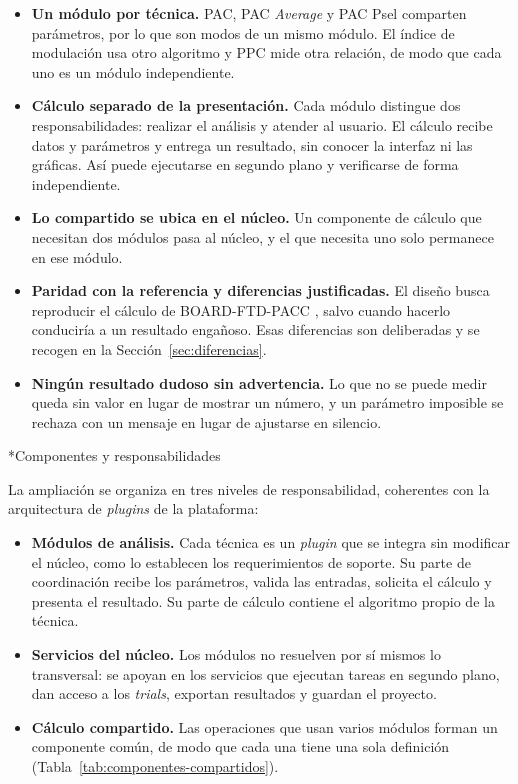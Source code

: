 \documentclass[12pt,letterpaper,oneside]{article}
\makeatletter
\newcommand{\subsubsubsection}[1]{%
  \@startsection{paragraph}{4}{\z@}{10pt plus 2pt minus 1pt}{4pt}%
    {\normalfont\normalsize\bfseries\itshape}*{#1}}
\makeatother
\begin{document}
\begin{itemize}
  \item \textbf{Un módulo por técnica.} PAC, PAC \textit{Average} y PAC Psel comparten parámetros, por lo que son modos de un mismo módulo. El índice de modulación usa otro algoritmo y PPC mide otra relación, de modo que cada uno es un módulo independiente.
  \item \textbf{Cálculo separado de la presentación.} Cada módulo distingue dos responsabilidades: realizar el análisis y atender al usuario. El cálculo recibe datos y parámetros y entrega un resultado, sin conocer la interfaz ni las gráficas. Así puede ejecutarse en segundo plano y verificarse de forma independiente.
  \item \textbf{Lo compartido se ubica en el núcleo.} Un componente de cálculo que necesitan dos módulos pasa al núcleo, y el que necesita uno solo permanece en ese módulo.
  \item \textbf{Paridad con la referencia y diferencias justificadas.} El diseño busca reproducir el cálculo de BOARD-FTD-PACC \cite{gauthier2023}, salvo cuando hacerlo conduciría a un resultado engañoso. Esas diferencias son deliberadas y se recogen en la Sección~\ref{sec:diferencias}.
  \item \textbf{Ningún resultado dudoso sin advertencia.} Lo que no se puede medir queda sin valor en lugar de mostrar un número, y un parámetro imposible se rechaza con un mensaje en lugar de ajustarse en silencio.
\end{itemize}

\subsubsubsection{Componentes y responsabilidades}

La ampliación se organiza en tres niveles de responsabilidad, coherentes con la arquitectura de \textit{plugins} de la plataforma:

\begin{itemize}
  \item \textbf{Módulos de análisis.} Cada técnica es un \textit{plugin} que se integra sin modificar el núcleo, como lo establecen los requerimientos de soporte. Su parte de coordinación recibe los parámetros, valida las entradas, solicita el cálculo y presenta el resultado. Su parte de cálculo contiene el algoritmo propio de la técnica.
  \item \textbf{Servicios del núcleo.} Los módulos no resuelven por sí mismos lo transversal: se apoyan en los servicios que ejecutan tareas en segundo plano, dan acceso a los \textit{trials}, exportan resultados y guardan el proyecto.
  \item \textbf{Cálculo compartido.} Las operaciones que usan varios módulos forman un componente común, de modo que cada una tiene una sola definición (Tabla~\ref{tab:componentes-compartidos}).
\end{itemize}
\end{document}
